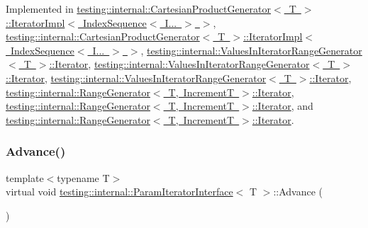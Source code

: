 Implemented in \mbox{\hyperlink{classtesting_1_1internal_1_1_cartesian_product_generator_1_1_iterator_impl_3_01_index_sequence_3_01_i_8_8_8_01_4_01_4_a167e8b38118c8635d5849daf924a517b}{testing\+::internal\+::\+Cartesian\+Product\+Generator$<$ T $>$\+::\+Iterator\+Impl$<$ Index\+Sequence$<$ I... $>$ $>$}}, \mbox{\hyperlink{classtesting_1_1internal_1_1_cartesian_product_generator_1_1_iterator_impl_3_01_index_sequence_3_01_i_8_8_8_01_4_01_4_a167e8b38118c8635d5849daf924a517b}{testing\+::internal\+::\+Cartesian\+Product\+Generator$<$ T $>$\+::\+Iterator\+Impl$<$ Index\+Sequence$<$ I... $>$ $>$}}, \mbox{\hyperlink{classtesting_1_1internal_1_1_values_in_iterator_range_generator_1_1_iterator_a5ff56489536cf5d90ed0ac07ffeb476b}{testing\+::internal\+::\+Values\+In\+Iterator\+Range\+Generator$<$ T $>$\+::\+Iterator}}, \mbox{\hyperlink{classtesting_1_1internal_1_1_values_in_iterator_range_generator_1_1_iterator_a5ff56489536cf5d90ed0ac07ffeb476b}{testing\+::internal\+::\+Values\+In\+Iterator\+Range\+Generator$<$ T $>$\+::\+Iterator}}, \mbox{\hyperlink{classtesting_1_1internal_1_1_values_in_iterator_range_generator_1_1_iterator_a49e0c9d26983eb8c76cc9c8ac4469dbf}{testing\+::internal\+::\+Values\+In\+Iterator\+Range\+Generator$<$ T $>$\+::\+Iterator}}, \mbox{\hyperlink{classtesting_1_1internal_1_1_range_generator_1_1_iterator_ad17bd99e352c43b8ab654a4ad479d06e}{testing\+::internal\+::\+Range\+Generator$<$ T, Increment\+T $>$\+::\+Iterator}}, \mbox{\hyperlink{classtesting_1_1internal_1_1_range_generator_1_1_iterator_ad17bd99e352c43b8ab654a4ad479d06e}{testing\+::internal\+::\+Range\+Generator$<$ T, Increment\+T $>$\+::\+Iterator}}, and \mbox{\hyperlink{classtesting_1_1internal_1_1_range_generator_1_1_iterator_a4a97adf3eafecc62a83dfb7cad1b27f0}{testing\+::internal\+::\+Range\+Generator$<$ T, Increment\+T $>$\+::\+Iterator}}.

\mbox{\label{classtesting_1_1internal_1_1_param_iterator_interface_a600dbd35fcb551463e379516a1abea48}} 
\subsubsection{\texorpdfstring{Advance()}{Advance()}\hspace{0.1cm}{\footnotesize\ttfamily [2/3]}}
{\footnotesize\ttfamily template$<$typename T$>$ \\
virtual void \mbox{\hyperlink{classtesting_1_1internal_1_1_param_iterator_interface}{testing\+::internal\+::\+Param\+Iterator\+Interface}}$<$ T $>$\+::Advance (\begin{DoxyParamCaption}{ }\end{DoxyParamCaption})\hspace{0.3cm}{\ttfamily [pure virtual]}}



